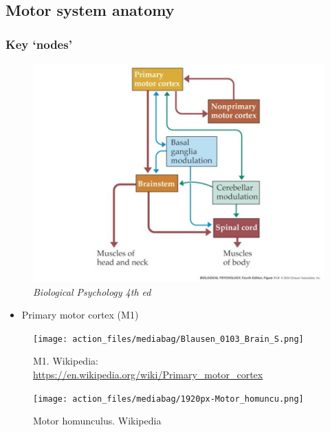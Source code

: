\documentclass[
  letterpaper,
  DIV=11,
  numbers=noendperiod]{scrartcl}
\providecommand{\tightlist}{%
  \setlength{\itemsep}{0pt}\setlength{\parskip}{0pt}}\usepackage{longtable,booktabs,array}
\begin{document}
\subsection{Motor system anatomy}\label{motor-system-anatomy}

\subsubsection{Key `nodes'}\label{key-nodes}

\begin{figure}[H]

{\centering \includegraphics{../include/img/motor-controllers-biopsych.jpg}

}

\caption{\emph{Biological Psychology 4th ed}}

\end{figure}%

\begin{itemize}
\tightlist
\item
  Primary motor cortex (M1)
\end{itemize}

\begin{figure}[H]

{\centering \texttt{[image: action\_files/mediabag/Blausen\_0103\_Brain\_S.png]}

}

\caption{M1. Wikipedia:
\url{https://en.wikipedia.org/wiki/Primary_motor_cortex}}

\end{figure}%
\begin{figure}[H]

{\centering \texttt{[image: action\_files/mediabag/1920px-Motor\_homuncu.png]}

}

\caption{Motor homunculus. Wikipedia}

\end{figure}%
\end{document}
